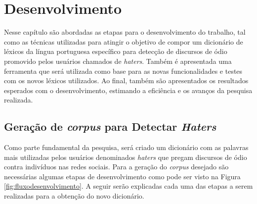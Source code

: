 \chapter{Desenvolvimento}
\label{cap:Desenvolvimento}
Nesse capítulo são abordadas as etapas para o desenvolvimento do trabalho, tal como as técnicas utilizadas para atingir o objetivo de compor um dicionário de léxicos da língua portuguesa específico para detecção de discursos de ódio promovido pelos usuários chamados de \textit{haters}. Também é apresentada uma ferramenta que será utilizada como base para as novas funcionalidades e testes com os novos léxicos utilizados. Ao final, também são apresentados os resultados esperados com o desenvolvimento, estimando a eficiência e os avanços da pesquisa realizada. 

\section{Geração de \textit{corpus} para Detectar \textit{Haters}}
\label{sec:geracaohater}
Como parte fundamental da pesquisa, será criado um dicionário com as palavras mais utilizadas pelos usuários denominados \textit{haters} que pregam discursos de ódio contra indivíduos nas redes sociais. Para a geração do \textit{corpus} desejado são necessárias algumas etapas de desenvolvimento como pode ser visto na Figura \ref{fig:fluxodesenvolvimento}. A seguir serão explicadas cada uma das etapas a serem realizadas para a obtenção do novo dicionário.

